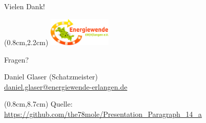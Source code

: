 \begin{frame}{Vielen Dank!}

   \begin{textblock*}{3cm}(0.8cm,2.2cm)  %
      \includegraphics[width=3cm]{images/Logo_EWERH_eV_small.png}
   \end{textblock*}
   \vspace{1.8cm}
   \begin{center}
      \Huge Fragen?
   \end{center}
   \vfill
   \begin{minipage}{0.20\textwidth}
      \centering
   \end{minipage}
   \hfill
   \begin{minipage}{0.75\textwidth}
      \begin{flushright}
         \footnotesize Daniel Glaser (Schatzmeister) \\
         \href{mailto:daniel.glaser@energiewende-erlangen.de}{daniel.glaser@energiewende-erlangen.de}
      \end{flushright}
   \end{minipage}%

   \begin{textblock*}{11cm}(0.8cm,8.7cm)
      \centering 
      \footnotesize Quelle: \url{https://github.com/the78mole/Presentation_Paragraph_14_a}
   \end{textblock*}
\end{frame}

\usebackgroundtemplate{}
